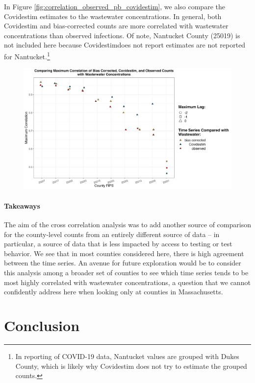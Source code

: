 \documentclass[12pt,twoside]{smiththesis}
\begin{document}
In Figure \ref{fig:correlation_observed_pb_covidestim}, we also compare the Covidestim estimates to the wastewater concentrations. In general, both Covidestim and bias-corrected counts are more correlated with wastewater concentrations than observed infections. Of note, Nantucket County (25019) is not included here because Covidestimdoes not report estimates are not reported for Nantucket.\footnote{In reporting of COVID-19 data, Nantucket values are grouped with Dukes County, which is likely why Covidestim does not try to estimate the grouped counts.}
\begin{figure}
\includegraphics[width=1\linewidth]{figure/correlation_observed_pb_covidestim} \caption{\label{fig:correlation_observed_pb_covidestim}}\label{fig:unnamed-chunk-84}
\end{figure}
\hypertarget{takeaways}{%
\subsubsection{Takeaways}\label{takeaways}}

The aim of the cross correlation analysis was to add another source of comparison for the county-level counts from an entirely different source of data -- in particular, a source of data that is less impacted by access to testing or test behavior. We see that in most counties considered here, there is high agreement between the time series. An avenue for future exploration would be to consider this analysis among a broader set of counties to see which time series tends to be most highly correlated with wastewater concentrations, a question that we cannot confidently address here when looking only at counties in Massachusetts.

\hypertarget{conclusion}{%
\chapter{Conclusion}\label{conclusion}}
\end{document}
